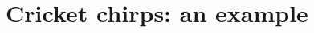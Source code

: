 \documentclass[12pt, leqno]{article} %
\begin{document}



\section{Cricket chirps: an example}
\end{document}

